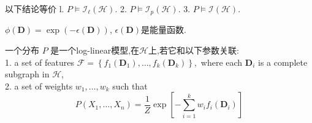 \documentclass{article}
\begin{document}
\begin{flushleft}
     以下结论等价
    l. $P \models \mathcal{I}_{\ell}(\mathcal{H})$.
    2. $P \models \mathcal{I}_{p}(\mathcal{H})$.
    3. $P \models \mathcal{I}(\mathcal{H})$.

     $\phi(\boldsymbol{D})=\exp (-\epsilon(\boldsymbol{D}))$, $\epsilon(\boldsymbol{D})$是能量函数.

    \begin{definition}
        一个分布 $P$ 是一个log-linear模型,在$\mathcal{H}$上,若它和以下参数关联:\\
            1. a set of features $\mathcal{F}=\left\{f_{1}\left(\boldsymbol{D}_{1}\right), \ldots, f_{k}\left(\boldsymbol{D}_{k}\right)\right\},$ where each $\boldsymbol{D}_{i}$ is a complete subgraph in $\mathcal{H}$,\\
            2. a set of weights $w_{1}, \ldots, w_{k}$
            such that
            $$
            P\left(X_{1}, \ldots, X_{n}\right)=\frac{1}{Z} \exp \left[-\sum_{i=1}^{k} w_{i} f_{i}\left(\boldsymbol{D}_{i}\right)\right]
            $$
    \end{definition}


\end{flushleft}
\end{document}
